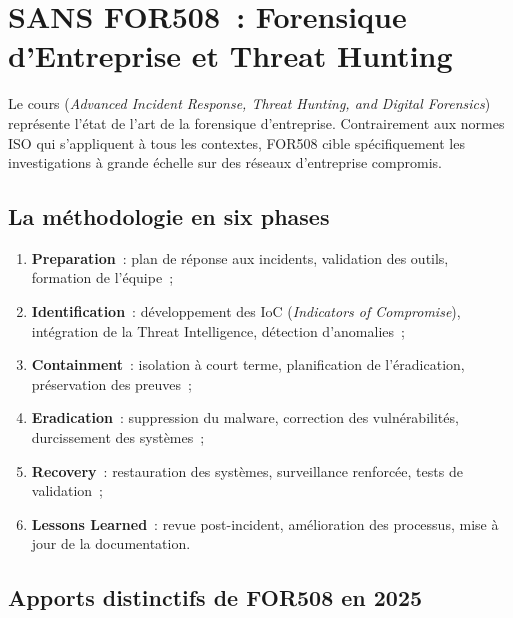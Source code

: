 \section{SANS FOR508~: Forensique d'Entreprise et Threat Hunting}
\label{sec:sans-for508}

Le cours  (\textit{Advanced Incident Response, Threat Hunting,
and Digital Forensics}) représente l'état de l'art de la forensique
d'entreprise. Contrairement aux normes ISO qui s'appliquent à tous les
contextes, FOR508 cible spécifiquement les investigations à grande échelle
sur des réseaux d'entreprise compromis.

\subsection{La méthodologie en six phases}

\begin{enumerate}
    \item \textbf{Preparation}~: plan de réponse aux incidents, validation des
          outils, formation de l'équipe~;
    \item \textbf{Identification}~: développement des IoC
          (\textit{Indicators of Compromise}), intégration de la Threat
          Intelligence, détection d'anomalies~;
    \item \textbf{Containment}~: isolation à court terme, planification
          de l'éradication, préservation des preuves~;
    \item \textbf{Eradication}~: suppression du malware, correction des
          vulnérabilités, durcissement des systèmes~;
    \item \textbf{Recovery}~: restauration des systèmes, surveillance
          renforcée, tests de validation~;
    \item \textbf{Lessons Learned}~: revue post-incident, amélioration des
          processus, mise à jour de la documentation.
\end{enumerate}

\subsection{Apports distinctifs de FOR508 en 2025}

